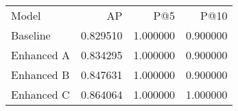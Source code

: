\begin{tabular}{lrrr}
Model & AP & P@5 & P@10 \\
Baseline & 0.829510 & 1.000000 & 0.900000 \\
Enhanced A & 0.834295 & 1.000000 & 0.900000 \\
Enhanced B & 0.847631 & 1.000000 & 0.900000 \\
Enhanced C & 0.864064 & 1.000000 & 1.000000 \\
\end{tabular}
